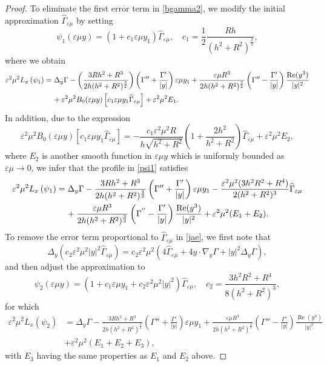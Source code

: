 \documentclass[11pt,reqno,a4paper]{amsart}
\numberwithin{equation}{section}
\newcommand{\ve}{\varepsilon}
\begin{document}
\begin{proof}
To eliminate the first error term in \eqref{bgamma2}, we modify the initial approximation $\widehat{\Gamma}_{\ve\mu}$ by setting \begin{equation}\label{psi1}
\psi_{1}(\ve\mu y)=(1+c_1\ve\mu y_1)\widehat{\Gamma}_{\ve\mu}, \quad c_1=\frac{1}{2}\frac{Rh}{(h^2+R^2)^{\frac 3 2}},
\end{equation}
where we obtain
\begin{align*}
\ve^2\mu^2 L_{x}\left(\psi_{1}\right)
&=\Delta_{y}\Gamma
-\left(\frac{3Rh^2+R^3}{2h(h^2+R^2)^{\frac{3}{2}}}\right)
 \left(\Gamma'' +\frac{\Gamma'}{|y|}\right)\ve\mu y_1
+ \frac{\ve\mu R^3}{2h(h^2+R^2)^{\frac{3}{2}}}
\left(\Gamma'' -\frac{\Gamma'}{|y|}\right)\frac{\operatorname{Re}(y^3) }{ |y|^2}\nonumber \\
& \hspace{4mm} + \ve^2\mu^2 B_{0}(\ve\mu y)\left[c_1\ve\mu y_1\widehat{\Gamma}_{\ve\mu}\right]+\ve^2\mu^2 E_1.
\end{align*} 
In addition, due to the expression
\[\ve^2\mu^2
B_0(\ve\mu y)[c_1\ve\mu y_1 \widehat\Gamma_{\ve\mu}]= -\frac{c_1\ve^2\mu^2 R}{h\sqrt{h^2+R^2}}\left(1+\frac{2h^2}{h^2+R^2}\right)\widehat{\Gamma}_{\ve\mu}+\ve^2\mu^2 E_2,\]
where $E_{2}$ is another smooth function in $\ve \mu y$ which is uniformly bounded as $\ve\mu \to 0$, we infer that the profile in \eqref{psi1} satisfies
\begin{equation}\label{jae}
\begin{aligned}
\ve^2\mu^2 L_{x}\left(\psi_{1}\right)
&=  \Delta_{y}\Gamma
-\frac{3Rh^2+R^3}{2h(h^2+R^2)^{\frac{3}{2}}}\left(\Gamma'' +\frac{\Gamma'}{|y|}\right)\ve\mu y_1
-
 \frac{\ve^2\mu^2 (3h^2R^2+R^4)}{2(h^2+R^2)^3} \widehat{\Gamma}_{\ve\mu}
\\
& \hspace{4mm} + \frac{\ve\mu R^3}{2h(h^2+R^2)^{\frac{3}{2}}}
\left(\Gamma^{''} -\frac{\Gamma'}{|y|}\right)\frac{\operatorname{Re}(y^3) }{|y|^2}
+\ve^2\mu^2(E_1+E_2).
\end{aligned}
\end{equation}
To remove the error term proportional to $\widehat{\Gamma}_{\ve\mu}$ in \eqref{jae}, we first note that  
\[
   \Delta_{y}\left(c_2 \ve^2\mu^2|y|^2\widehat\Gamma_{\ve\mu}\right)
=c_2\ve^2\mu^2\left(4\widehat{\Gamma}_{\ve\mu}+4 y\cdot\nabla_{y}\Gamma+|y|^2\Delta_{y}\Gamma\right),\]
and then adjust the approximation to 
\begin{equation*}
\psi_{2}(\ve\mu y)=\left(1+c_1\ve\mu y_1+c_2\ve^2\mu^2|y|^2\right)\widehat\Gamma_{\ve\mu}, \quad c_2= \frac{3h^2R^2+R^4}{8(h^2+R^2)^3},
\end{equation*}
for which
\begin{equation}\label{errorsecondapprox}
\begin{aligned}
\ve^2 \mu^2 L_{x}\left(\psi_{2}\right) &=  \Delta_{y}\Gamma
-\frac{3Rh^2+R^3}{2h(h^2+R^2)^{\frac 3 2}}
 \left(\Gamma'' +\frac{\Gamma'}{|y|}\right)\ve\mu y_1
  + \frac{\ve\mu R^3}{2h(h^2+R^2)^{\frac 3 2}} \left(\Gamma'' -\frac{\Gamma'}{|y|}\right)\frac{\operatorname{Re}(y^3)}{|y|^2}\\
  &+\ve^2\mu^2(E_1 +E_2+E_3),
\end{aligned}
\end{equation}
with $E_3$ having the same properties as $E_1$ and $E_2$ above.


\end{proof}
\end{document}
